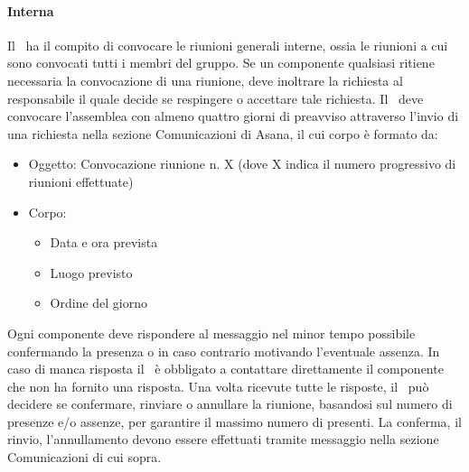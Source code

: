 \documentclass[../NormeDiProgetto.tex]{subfiles}
\begin{document}
					\paragraph{Interna\\}
						Il \responsabilediprogetto\ ha il compito di convocare le riunioni generali interne, ossia
						le riunioni a cui sono convocati tutti i membri del gruppo.
						Se un componente qualsiasi ritiene necessaria la convocazione di una riunione, deve
						inoltrare la richiesta al responsabile il quale decide se respingere o accettare
						tale richiesta.
						Il \responsabilediprogetto\ deve convocare l'assemblea con almeno quattro giorni di preavviso
						attraverso l'invio di una richiesta nella sezione Comunicazioni di Asana, il cui
						corpo è formato da:
						\begin{itemize}
							\item Oggetto: Convocazione riunione n. X (dove X indica il numero progressivo
							di riunioni effettuate)
							\item Corpo:
							\begin{itemize}
								\item Data e ora prevista
								\item Luogo previsto
								\item Ordine del giorno
							\end{itemize}
						\end{itemize}
						Ogni componente deve rispondere al messaggio nel minor tempo possibile confermando
						la presenza o in caso contrario motivando l'eventuale assenza. In caso di manca risposta
						il \responsabilediprogetto\ è obbligato a contattare direttamente il componente che non
						ha fornito una risposta. Una volta ricevute tutte le risposte, il \responsabilediprogetto\
						può decidere se confermare, rinviare o annullare la riunione, basandosi sul numero di
						presenze e/o assenze, per garantire il massimo numero di presenti. La conferma, il rinvio,
						l'annullamento devono essere effettuati tramite messaggio nella sezione Comunicazioni di cui
						sopra.
\end{document}
